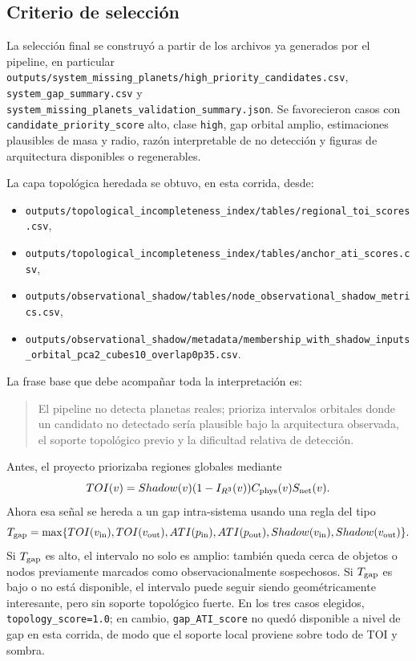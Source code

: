 \subsection{Criterio de selecci\'on}

La selecci\'on final se construy\'o a partir de los archivos ya generados por el pipeline, en particular \texttt{outputs/system\_missing\_planets/high\_priority\_candidates.csv}, \texttt{system\_gap\_summary.csv} y \texttt{system\_missing\_planets\_validation\_summary.json}. Se favorecieron casos con \texttt{candidate\_priority\_score} alto, clase \texttt{high}, gap orbital amplio, estimaciones plausibles de masa y radio, raz\'on interpretable de no detecci\'on y figuras de arquitectura disponibles o regenerables.

La capa topol\'ogica heredada se obtuvo, en esta corrida, desde:
\begin{itemize}
\item \texttt{outputs/topological\_incompleteness\_index/tables/regional\_toi\_scores.csv},
\item \texttt{outputs/topological\_incompleteness\_index/tables/anchor\_ati\_scores.csv},
\item \texttt{outputs/observational\_shadow/tables/node\_observational\_shadow\_metrics.csv},
\item \texttt{outputs/observational\_shadow/metadata/membership\_with\_shadow\_inputs\_orbital\_pca2\_cubes10\_overlap0p35.csv}.
\end{itemize}

La frase base que debe acompa\~nar toda la interpretaci\'on es:
\begin{quote}
El pipeline no detecta planetas reales; prioriza intervalos orbitales donde un candidato no detectado ser\'ia plausible bajo la arquitectura observada, el soporte topol\'ogico previo y la dificultad relativa de detecci\'on.
\end{quote}

Antes, el proyecto priorizaba regiones globales mediante
\[
TOI(v)=Shadow(v)(1-I_{R^3}(v))C_{\rm phys}(v)S_{\rm net}(v).
\]
Ahora esa se\~nal se hereda a un gap intra-sistema usando una regla del tipo
\[
T_{\rm gap} =
\max\{
TOI(v_{\rm in}),
TOI(v_{\rm out}),
ATI(p_{\rm in}),
ATI(p_{\rm out}),
Shadow(v_{\rm in}),
Shadow(v_{\rm out})
\}.
\]
Si $T_{\rm gap}$ es alto, el intervalo no solo es amplio: tambi\'en queda cerca de objetos o nodos previamente marcados como observacionalmente sospechosos. Si $T_{\rm gap}$ es bajo o no est\'a disponible, el intervalo puede seguir siendo geom\'etricamente interesante, pero sin soporte topol\'ogico fuerte. En los tres casos elegidos, \texttt{topology\_score=1.0}; en cambio, \texttt{gap\_ATI\_score} no qued\'o disponible a nivel de gap en esta corrida, de modo que el soporte local proviene sobre todo de TOI y sombra.


